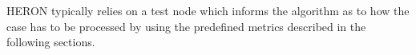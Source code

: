 HERON typically relies on a test node which informs the algorithm as to how the case has to be processed by using the predefined metrics described in the following sections.
